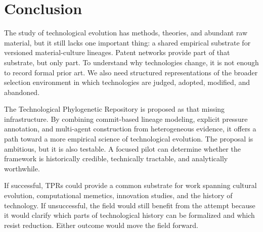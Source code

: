 \section{Conclusion}

The study of technological evolution has methods, theories, and abundant raw material, but it still lacks one important thing: a shared empirical substrate for versioned material-culture lineages. Patent networks provide part of that substrate, but only part. To understand why technologies change, it is not enough to record formal prior art. We also need structured representations of the broader selection environment in which technologies are judged, adopted, modified, and abandoned.

The Technological Phylogenetic Repository is proposed as that missing infrastructure. By combining commit-based lineage modeling, explicit pressure annotation, and multi-agent construction from heterogeneous evidence, it offers a path toward a more empirical science of technological evolution. The proposal is ambitious, but it is also testable. A focused pilot can determine whether the framework is historically credible, technically tractable, and analytically worthwhile.

If successful, TPRs could provide a common substrate for work spanning cultural evolution, computational memetics, innovation studies, and the history of technology. If unsuccessful, the field would still benefit from the attempt because it would clarify which parts of technological history can be formalized and which resist reduction. Either outcome would move the field forward.
